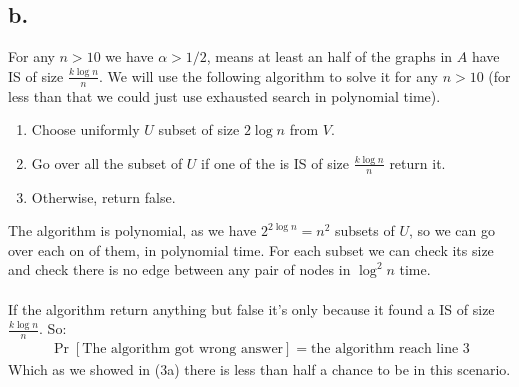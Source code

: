 \documentclass[11pt]{article}
\theoremstyle{plain}
\theoremstyle{nonumberplainnobrackets}
\begin{document}
\subsection*{b.}
For any $n>10$ we have $\alpha >1/2$, means at least an half of the graphs in $A$ have IS of size $\frac{k\log n }{n}$. We will use the following algorithm to solve it for any $n>10$ (for less than that we could just use exhausted search in polynomial time).
\begin{enumerate}
	\item Choose uniformly $U$ subset of size $2\log n$ from $V$.
	\item Go over all the subset of $U$ if one of the is IS of size $\frac{k\log n }{n}$ return it.
	\item Otherwise, return false. 
\end{enumerate}
The algorithm is polynomial, as we have $2^{2\log n} = n^2$ subsets of $U$, so we can go over each on of them, in polynomial time. For each subset we can check its size and check there is no edge between any pair of nodes in $\log ^2 n$ time.\\ \\
If the algorithm return anything but false it's only because it found a IS of size $\frac{k\log n }{n}$. So:
	\begin{align*}
\Pr[\text{The algorithm got wrong answer}] = \text{the algorithm reach line 3}
\end{align*}
Which as we showed in (3a) there is less than half a chance to be in this scenario.
\end{document}
